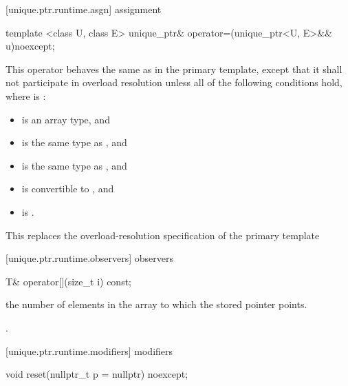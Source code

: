 [unique.ptr.runtime.asgn]{ assignment}

%
\begin{itemdecl}
template <class U, class E>
  unique_ptr& operator=(unique_ptr<U, E>&& u)noexcept;
\end{itemdecl}

\begin{itemdescr}
\pnum
This operator behaves the same as in the primary template,
except that it shall not participate in overload resolution
unless all of the following conditions hold,
where  is :

\begin{itemize}
\item {} is an array type, and
\item {} is the same type as , and
\item {} is the same type as , and
\item {} is convertible to , and
\item {} is .
\end{itemize}

\begin{note}
This replaces the overload-resolution specification of the primary template
\end{note}
\end{itemdescr}

[unique.ptr.runtime.observers]{ observers}

%
\begin{itemdecl}
T& operator[](size_t i) const;
\end{itemdecl}

\begin{itemdescr}
\pnum
\requires {} the
number of elements in the array to which
the stored pointer points.

\pnum
\returns {}.
\end{itemdescr}

[unique.ptr.runtime.modifiers]{ modifiers}

%
\begin{itemdecl}
void reset(nullptr_t p = nullptr) noexcept;
\end{itemdecl}

